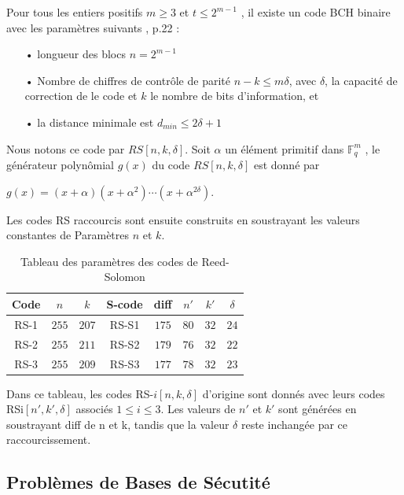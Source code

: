 \documentclass[12pt,openany]{report}
\begin{document}
Pour tous les entiers positifs
$m \geq 3$ et $t \leq 2^{m-1}$
, il existe un code BCH binaire avec les paramètres suivants \cite{melchor2020}, p.22 :
\begin{itemize}
\item[•] longueur des blocs $n=2^{m-1}  $
\item[•] Nombre de chiffres de contrôle de parité $n-k \leq m\delta$, avec $\delta$, la capacité de correction de
le code et $k$ le nombre de bits d’information, et
\item[•] la distance minimale est $d_{min}\leq 2\delta+1 $
\end{itemize}
Nous notons ce code par $RS[n, k, \delta]$. Soit $\alpha$ un élément primitif dans $ \mathbb{F}_q^m $
, le générateur
 polynômial $g(x)$ du code $RS[n, k,\delta]$ est donné par
 \begin{center}
 
$  g(x)=(x+\alpha)(x+\alpha^2)\cdots(x+\alpha^{2\delta}).$
 \end{center}
 Les codes RS raccourcis sont ensuite construits en soustrayant les valeurs constantes de
Paramètres $n$ et $k$.\\
\begin{table}

\centering
\begin{tabular}{|c|c|c|c|c|c|c|c|}
        \hline
        Code & $n$ & $k$ &S-code&diff& $n'$ & $k' $&$\delta$ \\
        \hline
        
        RS-1 & $255$ & $207$ & RS-S1& $175$& $80$ &$32$&$24$\\
        
        \hline
        
    RS-2 & $255$ & $211$ & RS-S2& $179$& $76$ &$32$&$22$\\  
     RS-3 & $255$ & $209$ & RS-S3& $177$& $78$ &$32$&$23$\\ 
     \hline    
\end{tabular}
\caption{Tableau des paramètres des codes de Reed-Solomon}
\label{reed_1}
\end{table}
Dans ce tableau, les codes RS-$i[n, k,\delta]$ d’origine sont donnés avec leurs codes RSi$[n',k',\delta]$ associés
$1\leq i\leq 3$. Les valeurs de $n'$ et $k'$
 sont générées en soustrayant
diff de n et k, tandis que la valeur $\delta$ reste inchangée par ce raccourcissement.

\subsection{Problèmes de Bases de Sécutité}
\end{document}
